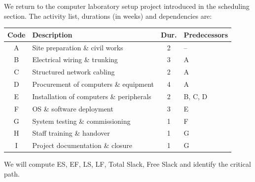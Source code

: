 \documentclass[11pt]{article}
\begin{document}
We return to the computer laboratory setup project introduced in the scheduling section. The activity list, durations (in weeks) and dependencies are:

\begin{center}
\begin{tabularx}{\linewidth}{|c|l|c|X|}\hline
\textbf{Code} & \textbf{Description} & \textbf{Dur.} & \textbf{Predecessors} \\ \hline
A & Site preparation \& civil works & 2 & -- \\
B & Electrical wiring \& trunking & 3 & A \\
C & Structured network cabling & 2 & A \\
D & Procurement of computers \& equipment & 4 & A \\
E & Installation of computers \& peripherals & 2 & B, C, D \\
F & OS \& software deployment & 3 & E \\
G & System testing \& commissioning & 1 & F \\
H & Staff training \& handover & 1 & G \\
I & Project documentation \& closure & 1 & G \\ \hline
\end{tabularx}
\end{center}

We will compute ES, EF, LS, LF, Total Slack, Free Slack and identify the critical path.
\end{document}
